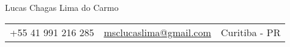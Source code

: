 \pagestyle{fancy} %
\fancyhf{} 
\renewcommand{\headrulewidth}{0pt}

\thispagestyle{empty}
\begin{center}
	{\huge Lucas Chagas Lima do Carmo}
	
	\vspace{6pt}
	
	\begin{tabular}{c|c|c}
		\arrayrulecolor{Accent}
		+55 41 991 216 285 & \textcolor{Accent}{\underline{\href{mailto:msclucaslima@gmail.com}{msclucaslima@gmail.com}}} & Curitiba - PR
	\end{tabular}
	
	\vspace{12pt}
\end{center}
